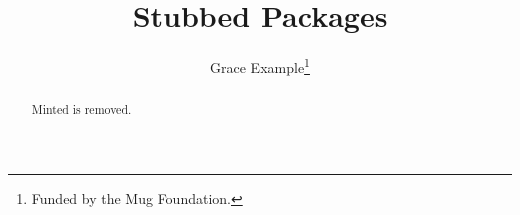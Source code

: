 \documentclass{article}
\begin{document}
\title{Stubbed Packages}
\author{Grace Example\thanks{Funded by the Mug Foundation.}}
\maketitle
\begin{abstract}
Minted is removed.
\end{abstract}
\end{document}
